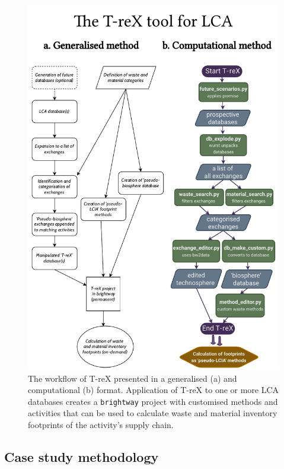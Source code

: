 \documentclass[a4paper,fleqn]{cas-dc}
\begin{document}
\begin{figure}[]
	\centering
	\includegraphics[width=1.8\columnwidth]{figs/T-reX_method.pdf}
	\caption{The workflow of T-reX presented in a generalised (a) and computational (b) format. Application of T-reX to one or more LCA databases creates a \texttt{brightway} project with customised methods and activities that can be used to calculate waste and material inventory footprints of the activity's supply \protect{} chain.}\label{fig:methods-flowchart}
\end{figure}

\subsection{Case study methodology}\label{sec:method-casestudy}
\end{document}
